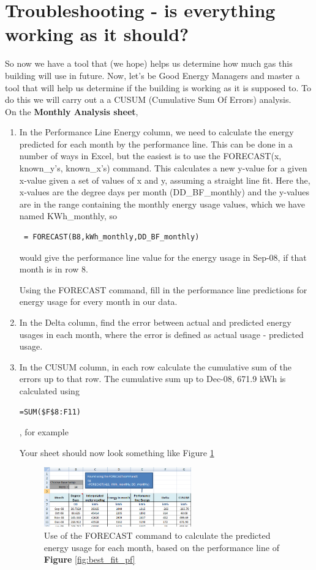 \documentclass{article}
\begin{document}
\section{Troubleshooting - is everything working as it should?}
So now we have a tool that (we hope) helps us determine how much gas this building will use in future. Now, let's be Good Energy Managers and master a tool that will help us determine if the building is working as it is supposed to. To do this we will carry out a a CUSUM (Cumulative Sum Of Errors) analysis.\\
On the \textbf{Monthly Analysis sheet},
\begin{enumerate}
\item In the Performance Line Energy column, we need to calculate the energy predicted for each month by the performance line. This can be done in a number of ways in Excel, but the easiest is to use the {\color{blue}FORECAST}(x, known\_y's, known\_x's) command.  This calculates a new y-value for a given x-value given a set of values of x and y, assuming a straight line fit. Here the, x-values are the degree days per month (DD\_BF\_monthly) and the y-values are in the range containing the monthly energy usage values, which we have named KWh\_monthly, so
{\color{blue}
\begin{verbatim}
 = FORECAST(B8,kWh_monthly,DD_BF_monthly)
 \end{verbatim}
}
would give the performance line value for the energy usage in Sep-08, if that month is in row 8.

Using the {\color{blue}FORECAST} command, fill in the performance line predictions for energy usage for every month in our data.

\item In the Delta column, find the error between actual and predicted energy usages in each month, where the error is defined as actual usage - predicted usage.
\item In the CUSUM column, in each row calculate the cumulative sum of the errors up to that row. The cumulative sum up to Dec-08, 671.9 kWh is calculated using {\color{blue}\begin{verbatim}=SUM($F$8:F11)\end{verbatim}}, for example

Your sheet should now look something like Figure \ref{fig:forecast_command}

\begin{figure}
\includegraphics[width=0.6\textwidth]{forecast_command}
\caption{Use of the {\color{blue}FORECAST} command to calculate the predicted energy usage for each month, based on the performance line of \textbf{Figure} \ref{fig:best_fit_pf}}
\label{fig:forecast_command}
\end{figure}


\end{enumerate}
\end{document}
